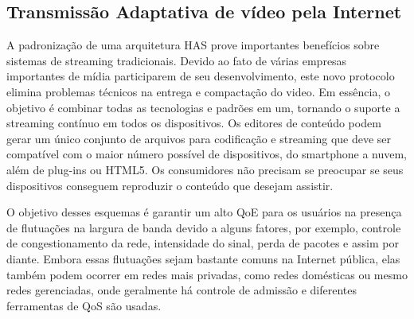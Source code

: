 \subsection{Transmissão Adaptativa de vídeo pela Internet}
\label{sec:has-dash}

A padronização de uma arquitetura HAS prove importantes benefícios sobre sistemas de streaming tradicionais. Devido ao fato de várias empresas importantes de mídia participarem de seu desenvolvimento, este novo protocolo elimina problemas técnicos na entrega e compactação do video. Em essência, o objetivo é combinar todas as tecnologias e padrões em um, tornando o suporte a streaming contínuo em todos os dispositivos. 
Os editores de conteúdo podem gerar um único conjunto de arquivos para codificação e streaming que deve ser compatível com o maior número possível de dispositivos, do smartphone a nuvem, além de plug-ins ou HTML5. Os consumidores não precisam se preocupar se seus dispositivos conseguem reproduzir o conteúdo que desejam assistir.

O objetivo desses esquemas é garantir um alto QoE para os usuários na presença de flutuações na largura de banda devido a alguns fatores, por exemplo, controle de congestionamento da rede, intensidade do sinal, perda de pacotes e assim por diante. Embora essas flutuações sejam bastante comuns na Internet pública, elas também podem ocorrer em redes mais privadas, como redes domésticas ou mesmo redes gerenciadas, onde geralmente há controle de admissão e diferentes ferramentas de QoS são usadas. 

